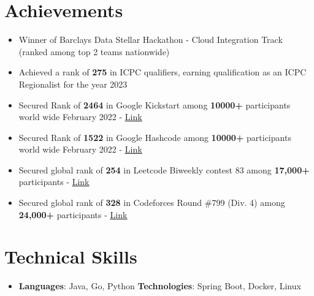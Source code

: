 \documentclass[letterpaper,11pt]{article}
\newcommand{\resumeItem}[1]{
  \item\small{
	{#1 \vspace{-2pt}}
  }
}
\newcommand{\resumeSubHeadingListStart}{\begin{itemize}[leftmargin=0.0in, label={}]}
\newcommand{\resumeSubHeadingListEnd}{\end{itemize}}
\newcommand{\resumeItemListStart}{\begin{itemize}}
\newcommand{\resumeItemListEnd}{\end{itemize}\vspace{-5pt}}
\begin{document}
\section{Achievements}
	\vspace{0pt}
	\resumeItemListStart
        \resumeItem{Winner of Barclays Data Stellar Hackathon - Cloud Integration Track (ranked among top 2 teams nationwide)}
        \resumeItem{Achieved a rank of \textbf{275} in ICPC qualifiers, earning qualification as an ICPC Regionalist for the year 2023}
	\resumeItem{Secured Rank of \textbf{2464} in Google Kickstart among        \textbf{10000+} participants world wide February 2022 - }\href{https://drive.google.com/file/d/1hpEC0VQ79eaoYqZdxUPCAr94_IM9jkv7/view?usp=sharing}{\underline{Link}}
        \resumeItem{Secured Rank of \textbf{1522} in Google Hashcode among \textbf{10000+} participants world wide February 2022 - }\href{https://drive.google.com/file/d/1gow_R_haexq3Mp_zzeyG5gf5uFmlrnZo/view?usp=sharing}{\underline{Link}}
    	\resumeItem{Secured global rank of \textbf{254} in Leetcode Biweekly contest 83 among \textbf{17,000+} participants -}\href{https://leetcode.com/Srikanth11u2/}{\underline{Link}}
    	\resumeItem{Secured global rank of \textbf{328} in Codeforces Round \#799 (Div. 4) among \textbf{24,000+} participants -}\href{https://codeforces.com/profile/Srikanth1777}{\underline{Link}}
  	\resumeItemListEnd
\vspace{-20pt}


 
%
\section{Technical Skills}
	\vspace{0pt}
 \resumeSubHeadingListStart
  \item{
     \textbf{Languages}{: Java, Go, Python}
     \hfill
     \textbf{Technologies}{: Spring Boot, Docker, Linux}
  }
 \resumeSubHeadingListEnd
\vspace{-16pt}
\end{document}

